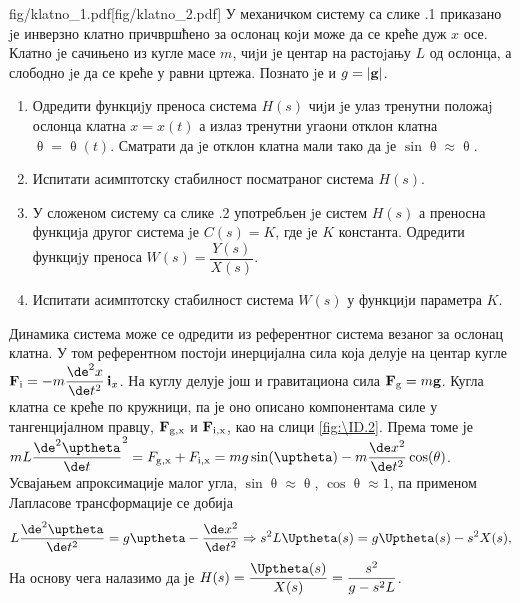 \mnDifficult\begin{slikaDesno}{fig/klatno_1.pdf}[fig/klatno_2.pdf]
    \PID \label{zad:klatno}
    У механичком систему са слике \ID.1 приказано jе инверзно клатно причвршћено
    за ослонац коjи може да се креће дуж $x$ осе. Клатно jе сачињено из кугле масе
    $m$, чиjи jе центар на растоjању $L$ од ослонца, а слободно jе да се креће у равни
    цртежа. Познато jе и $g = |{\bf g}|$.
    \begin{enumerate}[label=(\alph*)]
        \item Одредити функциjу преноса система $H(s)$ чиjи jе улаз тренутни положаj
              ослонца клатна $x = x(t)$ а излаз тренутни угаони отклон клатна 
              $\uptheta = \uptheta(t)$. Сматрати да jе отклон клатна мали тако да jе $\sin \uptheta \approx \uptheta$.
        \item Испитати асимптотску стабилност посматраног система $H(s)$.
        \item У сложеном систему са слике \ID.2 употребљен jе систем $H(s)$ а преносна функциjа другог система jе 
        $C(s) = K$, где jе $K$ константа. Одредити функциjу
        преноса $W(s) = \dfrac{Y(s)}{X(s)}$.
        \item Испитати асимптотску стабилност система $W(s)$ у функциjи параметра $K$.
    \end{enumerate}
\end{slikaDesno} \vspace*{5mm}

\RESENJE

Динамика система може се одредити из референтног система везаног за ослонац клатна. У том референтном постоји инерцијална сила 
која делује на центар кугле 
${\bf F}_{\rm i} = - m \dfrac{\de^2 x}{\de t^2}\,{\bf i}_x$. На куглу делује још и гравитациона сила ${\bf F}_{\rm g} = m{\bf g}$.
Кугла клатна се креће по кружници, па је оно описано компонентама силе у тангенцијалном правцу, ${\bf F}_{\rm g,x}$ и ${\bf F}_{\rm i,x}$, као
на слици \ref{fig:\ID.2}.
Према томе је $mL\dfrac{\de^2 \uptheta}{\de t}^2 = F_{\rm g,x} + F_{\rm i,x} = mg\sin(\uptheta) - m\dfrac{\de x^2}{\de t^2}\cos(\theta)$. 
Усвајањем апроксимације малог угла, $\sin\uptheta \approx \uptheta$, $\cos\uptheta \approx 1$, па применом Лапласове трансформације се добија
\begin{eqnarray}
    L\dfrac{\de^2 \uptheta}{\de t^2} = g\uptheta - \dfrac{\de x^2}{\de t^2} \Rightarrow
    s^2 L \Uptheta(s) = g\Uptheta(s) - s^2 X(s),
\end{eqnarray}
На основу чега налазимо да је $H(s) = \dfrac{\Uptheta(s)}{X(s)} = \dfrac{s^2}{g - s^2L}$. 

